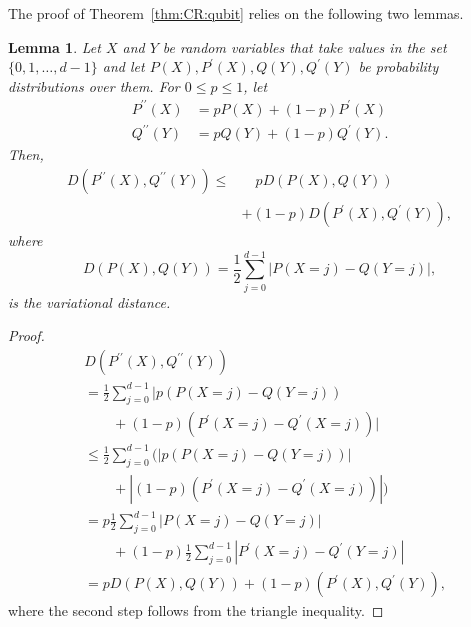 \documentclass[DIV=calc,fontsize=12pt]{scrartcl} %
\theoremstyle{definition}
\theoremstyle{plain}
\newtheorem{lemma}[definition]{Lemma}
\begin{document}
The proof of Theorem~\ref{thm:CR:qubit} relies on the following two
lemmas.

\begin{lemma}
\label{lem:CR:convex}
Let $X$ and $Y$ be random variables that take values in the set
$\{0,1,\ldots,d-1\}$ and let $P(X), P^{\prime}(X), Q(Y),
Q^{\prime}(Y)$ be probability distributions over them.  For $0 \leq
p \leq 1$, let
\begin{align}
P^{\prime\prime}(X) & = p P(X) + (1-p)P^{\prime}(X) \\
Q^{\prime\prime}(Y) & = p Q(Y) + (1-p)Q^{\prime}(Y).
\end{align}
Then,
\begin{align}
D \left (P^{\prime\prime}(X),Q^{\prime\prime}(Y) \right ) \leq &\quad p D
\left ( P(X),Q(Y) \right ) \nonumber\\
&+ (1-p)D \left (
P^{\prime}(X),Q^{\prime}(Y) \right ),
\end{align}
where
\begin{equation}
D \left ( P(X),Q(Y) \right ) = \frac{1}{2} \sum_{j=0}^{d-1} \left
| P(X=j) - Q(Y=j)\right |,
\end{equation}
is the variational distance.
\end{lemma}
\begin{proof}
  \begin{align}
	& D  ( P^{\prime\prime}(X), Q^{\prime\prime}(Y)  ) \nonumber\\
	& =
    \frac{1}{2} \sum_{j=0}^{d-1}  | p  ( P(X=j) -
        Q(Y=j) ) \nonumber\\
				&\quad\quad+ (1-p)  ( P^{\prime}(X=j) -
        Q^{\prime}(X=j) ) | \\
    & \leq \frac{1}{2} \sum_{j=0}^{d-1}  (  | p  (
          P(X=j) - Q(Y=j) )  | \nonumber\\
					&\quad\quad +  | (1-p)  (
          P^{\prime}(X=j) - Q^{\prime}(X=j) ) |  ) \\
  & = p \frac{1}{2} \sum_{j=0}^{d-1}  | P(X=j) - Q(Y=j) | \nonumber\\
	&\quad\quad +
  (1-p) \frac{1}{2} \sum_{j=0}^{d-1}  | P^{\prime}(X=j) -
    Q^{\prime}(Y=j) |  \\
  & = p D  ( P(X), Q(Y) ) + (1-p)  ( P^{\prime}(X),
    Q^{\prime}(Y) ),
 \end{align}
where the second step follows from the triangle inequality.
\end{proof}
\end{document}
